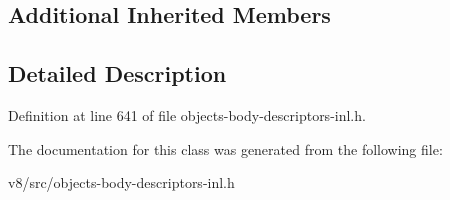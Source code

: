 \subsection*{Additional Inherited Members}


\subsection{Detailed Description}


Definition at line 641 of file objects-\/body-\/descriptors-\/inl.\+h.



The documentation for this class was generated from the following file\+:\begin{DoxyCompactItemize}
\item 
v8/src/objects-\/body-\/descriptors-\/inl.\+h\end{DoxyCompactItemize}
